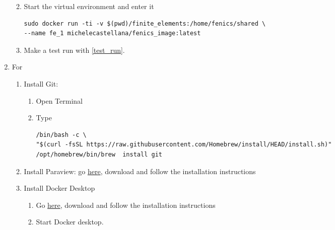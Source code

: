 \documentclass{article}
\begin{document}
\begin{enumerate}
\begin{enumerate}
\begin{enumerate}
                        \end{enumerate}

                  \item Start the virtual environment and enter it
                        \begin{verbatim}
sudo docker run -ti -v $(pwd)/finite_elements:/home/fenics/shared \
--name fe_1 michelecastellana/fenics_image:latest
\end{verbatim}


                  \item Make a test run with \cref{test_run}.
            \end{enumerate}

      \item For \macos
            \begin{enumerate}
                  \item Install Git:
                        \begin{enumerate}
                              \item Open Terminal
                              \item Type
                                    \begin{verbatim}
/bin/bash -c \
"$(curl -fsSL https://raw.githubusercontent.com/Homebrew/install/HEAD/install.sh)"
/opt/homebrew/bin/brew  install git
                                    \end{verbatim}
                        \end{enumerate}

                  \item Install Paraview:                  go  \href{https://www.paraview.org/download/}{here},  download and follow the installation instructions
                  \item Install Docker Desktop
                        \begin{enumerate}
                              \item                   Go   \href{https://www.docker.com/products/docker-desktop/}{here}, download  and follow the installation instructions
                              \item Start Docker desktop.
                        \end{enumerate}


\end{enumerate}
\end{enumerate}
\end{document}
